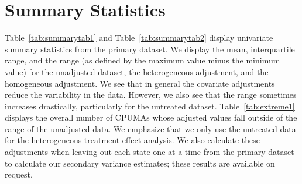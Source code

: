\section{Summary Statistics}
\label{sec:appendixsumstat}

Table~\ref{tab:summarytab1} and Table~\ref{tab:summarytab2} display univariate summary statistics from the primary dataset. We display the mean, interquartile range, and the range (as defined by the maximum value minus the minimum value) for the unadjusted dataset, the heterogeneous adjustment, and the homogeneous adjustment. We see that in general the covariate adjustments reduce the variability in the data. However, we also see that the range sometimes increases drastically, particularly for the untreated dataset. Table~\ref{tab:extreme1} displays the overall number of CPUMAs whose adjusted values fall outside of the range of the unadjusted data. We emphasize that we only use the untreated data for the heterogeneous treatment effect analysis. We also calculate these adjustments when leaving out each state one at a time from the primary dataset to calculate our secondary variance estimates; these results are available on request. 

